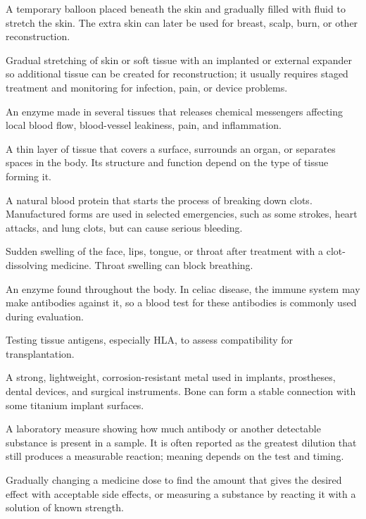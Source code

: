  A temporary balloon placed beneath the skin and gradually filled with fluid to stretch the skin. The extra skin can later be used for breast, scalp, burn, or other reconstruction.

 Gradual stretching of skin or soft tissue with an implanted or external expander so additional tissue can be created for reconstruction; it usually requires staged treatment and monitoring for infection, pain, or device problems.

 An enzyme made in several tissues that releases chemical messengers affecting local blood flow, blood-vessel leakiness, pain, and inflammation.

 A thin layer of tissue that covers a surface, surrounds an organ, or separates spaces in the body. Its structure and function depend on the type of tissue forming it.

 A natural blood protein that starts the process of breaking down clots. Manufactured forms are used in selected emergencies, such as some strokes, heart attacks, and lung clots, but can cause serious bleeding.

 Sudden swelling of the face, lips, tongue, or throat after treatment with a clot-dissolving medicine. Throat swelling can block breathing.

 An enzyme found throughout the body. In celiac disease, the immune system may make antibodies against it, so a blood test for these antibodies is commonly used during evaluation.

 Testing tissue antigens, especially HLA, to assess compatibility for transplantation.

 A strong, lightweight, corrosion-resistant metal used in implants, prostheses, dental devices, and surgical instruments. Bone can form a stable connection with some titanium implant surfaces.

 A laboratory measure showing how much antibody or another detectable substance is present in a sample. It is often reported as the greatest dilution that still produces a measurable reaction; meaning depends on the test and timing.

 Gradually changing a medicine dose to find the amount that gives the desired effect with acceptable side effects, or measuring a substance by reacting it with a solution of known strength.

